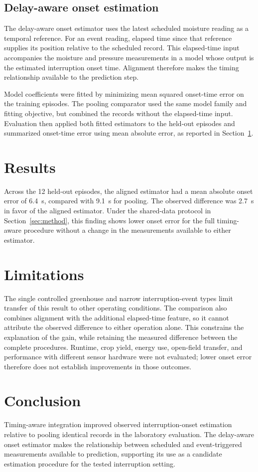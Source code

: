 \subsection{Delay-aware onset estimation}
The delay-aware onset estimator uses the latest scheduled moisture reading as a temporal reference. For an event reading, elapsed time since that reference supplies its position relative to the scheduled record. This elapsed-time input accompanies the moisture and pressure measurements in a model whose output is the estimated interruption onset time. Alignment therefore makes the timing relationship available to the prediction step.

Model coefficients were fitted by minimizing mean squared onset-time error on the training episodes. The pooling comparator used the same model family and fitting objective, but combined the records without the elapsed-time input. Evaluation then applied both fitted estimators to the held-out episodes and summarized onset-time error using mean absolute error, as reported in Section~\ref{sec:results}.

\section{Results}
\label{sec:results}
Across the 12 held-out episodes, the aligned estimator had a mean absolute onset error of 6.4~s, compared with 9.1~s for pooling. The observed difference was 2.7~s in favor of the aligned estimator. Under the shared-data protocol in Section~\ref{sec:method}, this finding shows lower onset error for the full timing-aware procedure without a change in the measurements available to either estimator.

\section{Limitations}
The single controlled greenhouse and narrow interruption-event types limit transfer of this result to other operating conditions. The comparison also combines alignment with the additional elapsed-time feature, so it cannot attribute the observed difference to either operation alone. This constrains the explanation of the gain, while retaining the measured difference between the complete procedures. Runtime, crop yield, energy use, open-field transfer, and performance with different sensor hardware were not evaluated; lower onset error therefore does not establish improvements in those outcomes.

\section{Conclusion}
Timing-aware integration improved observed interruption-onset estimation relative to pooling identical records in the laboratory evaluation. The delay-aware onset estimator makes the relationship between scheduled and event-triggered measurements available to prediction, supporting its use as a candidate estimation procedure for the tested interruption setting.
